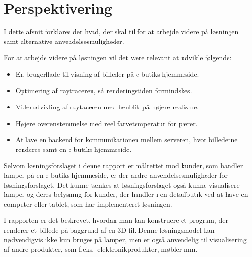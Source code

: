 \section{Perspektivering}
I dette afsnit forklares der hvad, der skal til for at arbejde videre på løsningen samt alternative anvendelsesmuligheder. 

For at arbejde videre på løsningen vil det være relevant at udvikle følgende:

\begin{itemize}
\item En brugerflade til visning af billeder på e-butiks hjemmeside.
\item Optimering af raytraceren, så renderingstiden formindskes. 
\item Viderudvikling af raytaceren med henblik på højere realisme.
\item Højere overenstemmelse med reel farvetemperatur for pærer.  
\item At lave en backend for kommunikationen mellem serveren, hvor billederne renderes samt en e-butiks hjemmeside.
\end{itemize}

Selvom løsningsforslaget i denne rapport er målrettet mod kunder, som handler lamper på en e-butiks hjemmeside, er der andre anvendelsesmuligheder for løsningsforslaget. Det kunne tænkes at løsningsforslaget også kunne visualisere lamper og deres belysning for kunder, der handler i en detailbutik ved at have en computer eller tablet, som har implementeret løsningen. 

I rapporten er det beskrevet, hvordan man kan konstruere et program, der renderer et billede på baggrund af en 3D-fil. Denne løsningsmodel kan nødvendigvis ikke kun bruges på lamper, men er også anvendelig til visualisering af andre produkter, som f.eks.\ elektronikprodukter, møbler mm.

\clearpage